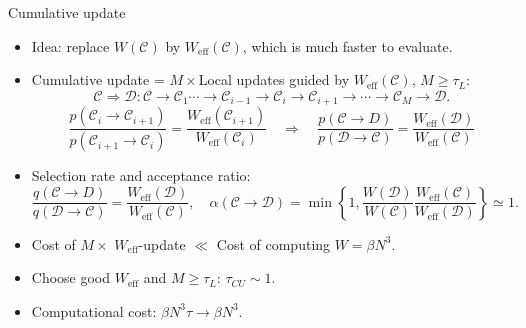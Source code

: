\documentclass[xcolor=table, 10pt, aspectratio=169]{beamer}
\begin{document}
\begin{frame}{Cumulative update}
  \begin{itemize}
    \item Idea: replace $W(\mathcal C)$ by $W_{\text{eff}}(\mathcal C)$, which is much faster to evaluate.
    \item Cumulative update = $M\times$Local updates guided by $W_{\text{eff}}(\mathcal C)$, $M\geq\tau_L$:
    \[\mathcal C\Rightarrow\mathcal D:
    \mathcal C\rightarrow\mathcal C_1\cdots\rightarrow\mathcal C_{i-1}\rightarrow\mathcal C_i\rightarrow\mathcal C_{i+1}\rightarrow\cdots\rightarrow\mathcal C_M\rightarrow\mathcal D.\]
    \[\frac{p(\mathcal C_i\rightarrow\mathcal C_{i+1})}{p(\mathcal C_{i+1}\rightarrow\mathcal C_i)}=\frac{W_{\text{eff}}(\mathcal C_{i+1})}{W_{\text{eff}}(\mathcal C_i)}
		\quad\Rightarrow\quad
		\frac{p(\mathcal C\rightarrow D)}
    {p(\mathcal D\rightarrow\mathcal C)}=\frac{W_{\text{eff}}(\mathcal D)}{W_{\text{eff}}(\mathcal C)}
		\]
    \item Selection rate and acceptance ratio:
    \[\frac{q(\mathcal C\rightarrow D)}
    {q(\mathcal D\rightarrow\mathcal C)}
    =\frac{W_{\text{eff}}(\mathcal D)}{W_{\text{eff}}(\mathcal C)},\quad
    \alpha(\mathcal C\rightarrow \mathcal D)=\min\left\{1, \frac{W(\mathcal D)}{W(\mathcal C)}
    \frac{W_{\text{eff}}(\mathcal C)}{W_{\text{eff}}(\mathcal D)}\right\}\simeq1.\]
		\item Cost of $M\times$ $W_{\text{eff}}$-update $\ll$ Cost of computing $W=\beta N^3$.
		\item Choose good $W_{\text{eff}}$ and $M\geq\tau_L$: $\tau_{CU}\sim1$.
    \item Computational cost: $\beta N^3\tau\rightarrow \beta N^3$.
  \end{itemize}
\end{frame}
\end{document}
